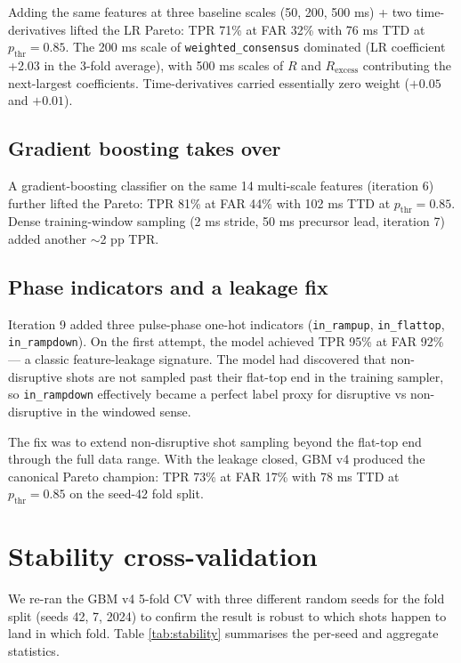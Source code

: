 \documentclass[11pt,letterpaper]{article}
\begin{document}
Adding the same features at three baseline scales (50, 200, 500 ms) +
two time-derivatives lifted the LR Pareto: TPR 71\% at FAR 32\% with 76
ms TTD at $p_{\mathrm{thr}} = 0.85$. The 200 ms scale of
\texttt{weighted\_consensus} dominated (LR coefficient +2.03 in the
3-fold average), with 500 ms scales of $R$ and $R_{\mathrm{excess}}$
contributing the next-largest coefficients. Time-derivatives carried
essentially zero weight ($+0.05$ and $+0.01$).

\subsection{Gradient boosting takes over}\label{ssec:gbm}

A gradient-boosting classifier on the same 14 multi-scale features
(iteration 6) further lifted the Pareto: TPR 81\% at FAR 44\% with 102
ms TTD at $p_{\mathrm{thr}} = 0.85$. Dense training-window sampling
(2 ms stride, 50 ms precursor lead, iteration 7) added another $\sim$2 pp
TPR.

\subsection{Phase indicators and a leakage fix}\label{ssec:leakage}

Iteration 9 added three pulse-phase one-hot indicators
(\texttt{in\_rampup}, \texttt{in\_flattop}, \texttt{in\_rampdown}). On
the first attempt, the model achieved TPR 95\% at FAR 92\% --- a
classic feature-leakage signature. The model had discovered that
non-disruptive shots are not sampled past their flat-top end in the
training sampler, so \texttt{in\_rampdown} effectively became a perfect
label proxy for disruptive vs non-disruptive in the windowed sense.

The fix was to extend non-disruptive shot sampling beyond the flat-top
end through the full data range. With the leakage closed, GBM v4
produced the canonical Pareto champion: TPR 73\% at FAR 17\% with 78 ms
TTD at $p_{\mathrm{thr}} = 0.85$ on the seed-42 fold split.

\section{Stability cross-validation}\label{sec:stability}

We re-ran the GBM v4 5-fold CV with three different random seeds for
the fold split (seeds 42, 7, 2024) to confirm the result is robust to
which shots happen to land in which fold. Table \ref{tab:stability}
summarises the per-seed and aggregate statistics.
\end{document}
